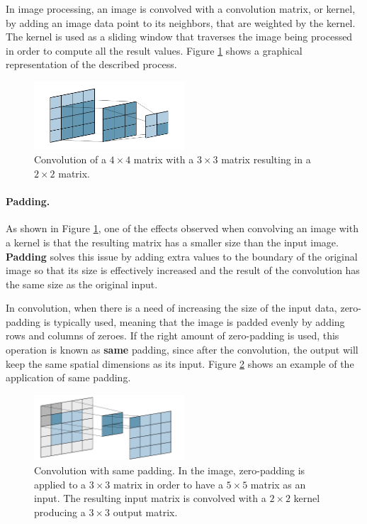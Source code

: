 In image processing, an image is convolved with a convolution matrix, or kernel, by adding an image data point to its neighbors, that are weighted by the kernel. The kernel is used as a sliding window that traverses the image being processed in order to compute all the result values. Figure \ref{fig:convolution} shows a graphical representation of the described process.

\begin{figure}
	\centering
	\includegraphics[width=0.5\textwidth]{images/convolution.png}
	\caption{Convolution of a $4\times4$ matrix with a $3\times3$ matrix resulting in a $2\times2$ matrix.}
	\label{fig:convolution}
\end{figure}

\paragraph{Padding.}
As shown in Figure \ref{fig:convolution}, one of the effects observed when convolving an image with a kernel is that the resulting matrix has a smaller size than the input image. \textbf{Padding} solves this issue by adding extra values to the boundary of the original image so that its size is effectively increased and the result of the convolution has the same size as the original input.

In convolution, when there is a need of increasing the size of the input data, zero-padding is typically used, meaning that the image is padded evenly by adding rows and columns of zeroes. If the right amount of zero-padding is used, this operation is known as \textbf{same} padding, since after the convolution, the output will keep the same spatial dimensions as its input. Figure \ref{fig:padding} shows an example of the application of same padding.

\begin{figure}
	\centering
	\includegraphics[width=0.5\textwidth]{images/padding.png}
	\caption{Convolution with same padding. In the image, zero-padding is applied to a $3\times3$ matrix in order to have a $5\times5$ matrix as an input. The resulting input matrix is convolved with a $2\times2$ kernel producing a $3\times3$ output matrix.}
	\label{fig:padding}
\end{figure}

